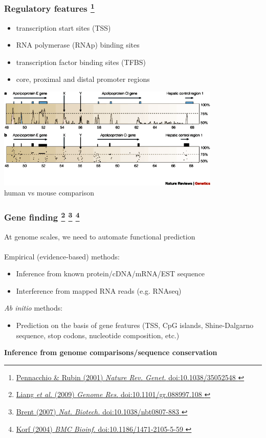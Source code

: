 %
\begin{frame}
  \frametitle{Regulatory features
  \footnote{\tiny{\href{http://dx.doi.org/10.1038/35052548
}{Pennacchio \& Rubin (2001) \textit{Nature Rev. Genet.} doi:10.1038/35052548
}}}  
  }
  \begin{itemize}
    \item transcription start sites (TSS)
    \item RNA polymerase (RNAp) binding sites
    \item transcription factor binding sites (TFBS)
    \item core, proximal and distal promoter regions
  \end{itemize}
  \begin{center}
    \includegraphics[width=0.8\textwidth]{images/regulatory_feature} \\
    \textcolor{hutton_green}{human vs mouse comparison}
  \end{center}    
\end{frame}

%
\begin{frame}
  \frametitle{Gene finding
  \footnote{\tiny{\href{http://dx.doi.org/10.1101/gr.088997.108
}{Liang \textit{et al.} (2009) \textit{Genome Res.} doi:10.1101/gr.088997.108
}}}
    \footnote{\tiny{\href{http://dx.doi.org/10.1038/nbt0807-883
}{Brent (2007) \textit{Nat. Biotech.} doi:10.1038/nbt0807-883
}}}
    \footnote{\tiny{\href{http://dx.doi.org/10.1186/1471-2105-5-59
}{Korf (2004) \textit{BMC Bioinf.} doi:10.1186/1471-2105-5-59
}}}
    }
  At genome scales, we need to automate functional prediction \\~\\    
  \textcolor{hutton_green}{Empirical (evidence-based) methods:}
  \begin{itemize}
    \item Inference from known protein/cDNA/mRNA/EST sequence
    \item Interference from mapped RNA reads (e.g. RNAseq)
  \end{itemize}
  \textcolor{hutton_blue}{\textit{Ab initio} methods:}
  \begin{itemize}
    \item Prediction on the basis of gene features (TSS, CpG islands, Shine-Dalgarno sequence, stop codons, nucleotide composition, etc.)
  \end{itemize}
  \textcolor{hutton_purple}{\textbf{Inference from genome comparisons/sequence conservation}}
\end{frame}


